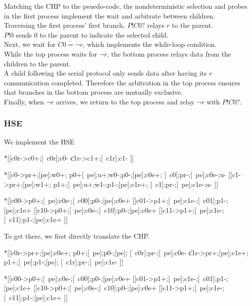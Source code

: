\documentclass{article}
\begin{document}
\noindent
Matching the CHP to the psuedo-code, the nondeterministic selection and
probes in the first process implement the wait and arbitrate between children. \\
Traversing the first process' first branch, $P!C0?$ relays $r$ to the parent. \\
$P!0$ sends $0$ to the parent to indicate the selected child. \\
Next, we wait for $\overline{C0=\neg r}$, which implements the while-loop
condition. \\
While the top process waits for $\neg r$, the bottom process relays
data from the children to the parent. \\
A child following the serial protocol only sends data after having
its $r$ communication completed. Therefore the arbitration in
the top process ensures that branches in the bottom process are mutually
exclusive. \\
Finally, when $\neg r$ arrives, we return to the top process and relay
$\neg r$ with $P!C0?$. \\


\subsubsection*{HSE}

We implement the HSE

\begin{hse}
*[[c0r->c0+;[~c0r];c0-
  \|c1r->c1+;[~c1r];c1-
 ]]

*[[c0->pr+;[pe];w0+;
    p0+[~pe];u+;w0-;p0-;[pe];c0e+;
    [~c0];pr-;[~pe];c0e-;u-
  []c1->pr+;[pe];w1+;
    p1+;[~pe];u+;w1-;p1-;[pe];c1e+;
    [~c1];pr-;[~pe];c1e-;u-
 ]]
\end{hse}

\begin{hse}
*[[c00->p0+;[~pe];c0e-;[~c00];p0-;[pe];c0e+
  []c01->p1+;[~pe];c1e-;[~c01];p1-;[pe];c1e+
  []c10->p0+;[~pe];c0e-;[~c10];p0-;[pe];c0e+
  []c11->p1+;[~pe];c1e-;[~c11];p1-;[pe];c1e+
 ]]
\end{hse}

\noindent
To get there, we first directly translate the CHP.

\begin{hse}
*[[c0r->pr+;[pe];c0e+;
    p0+;[~pe];p0-;[pe];
    [~c0r];pr-;[~pe];c0e-
  \|c1r->pr+;[pe];c1e+;
    p1+;[~pe];p1-;[pe];
    [~c1r];pr-;[~pe];c1e-
 ]]
\end{hse}

\begin{hse}
*[[c00->p0+;[~pe];c0e-;[~c00];p0-;[pe];c0e+
  []c01->p1+;[~pe];c1e-;[~c01];p1-;[pe];c1e+
  []c10->p0+;[~pe];c0e-;[~c10];p0-;[pe];c0e+
  []c11->p1+;[~pe];c1e-;[~c11];p1-;[pe];c1e+
 ]]
\end{hse}
\end{document}

